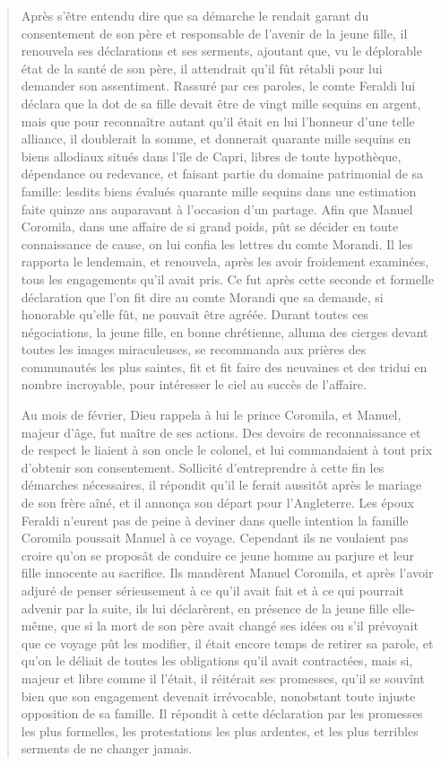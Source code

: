\begin{quote}
Après s'être entendu dire que sa démarche le rendait garant du consentement de son père et responsable de l'avenir de la jeune fille, il renouvela ses déclarations et ses serments, ajoutant que, vu le déplorable état de la santé de son père, il attendrait qu'il fût rétabli pour lui demander son assentiment. Rassuré par ces paroles, le comte Feraldi lui déclara que la dot de sa fille devait être de vingt mille sequins en argent, mais que pour reconnaître autant qu'il était en lui l'honneur d'une telle alliance, il doublerait la somme, et donnerait quarante mille sequins en biens allodiaux situés dans l'île de Capri, libres de toute hypothèque, dépendance ou redevance, et faisant partie du domaine patrimonial de sa famille: lesdits biens évalués quarante mille sequins dans une estimation faite quinze ans auparavant à l'occasion d'un partage. Afin que Manuel Coromila, dans une affaire de si grand poids, pût se décider en toute connaissance de cause, on lui confia les lettres du comte Morandi. Il les rapporta le lendemain, et renouvela, après les avoir froidement examinées, tous les engagements qu'il avait pris. Ce fut après cette seconde et formelle déclaration que l'on fit dire au comte Morandi que sa demande, si honorable qu'elle fût, ne pouvait être agréée. Durant toutes ces négociations, la jeune fille, en bonne chrétienne, alluma des cierges devant toutes les images miraculeuses, se recommanda aux prières des communautés les plus saintes, fit et fit faire des neuvaines et des tridui en nombre incroyable, pour intéresser le ciel au succès de l'affaire.

Au mois de février, Dieu rappela à lui le prince Coromila, et Manuel, majeur d'âge, fut maître de ses actions. Des devoirs de reconnaissance et de respect le liaient à son oncle le colonel, et lui commandaient à tout prix d'obtenir son consentement. Sollicité d'entreprendre à cette fin les démarches nécessaires, il répondit qu'il le ferait aussitôt après le mariage de son frère aîné, et il annonça son départ pour l'Angleterre. Les époux Feraldi n'eurent pas de peine à deviner dans quelle intention la famille Coromila poussait Manuel à ce voyage. Cependant ils ne voulaient pas croire qu'on se proposât de conduire ce jeune homme au parjure et leur fille innocente au sacrifice. Ils mandèrent Manuel Coromila, et après l'avoir adjuré de penser sérieusement à ce qu'il avait fait et à ce qui pourrait advenir par la suite, ils lui déclarèrent, en présence de la jeune fille elle-même, que si la mort de son père avait changé ses idées ou s'il prévoyait que ce voyage pût les modifier, il était encore temps de retirer sa parole, et qu'on le déliait de toutes les obligations qu'il avait contractées, mais si, majeur et libre comme il l'était, il réitérait ses promesses, qu'il se souvînt bien que son engagement devenait irrévocable, nonobstant toute injuste opposition de sa famille. Il répondit à cette déclaration par les promesses les plus formelles, les protestations les plus ardentes, et les plus terribles serments de ne changer jamais.


\end{quote}
